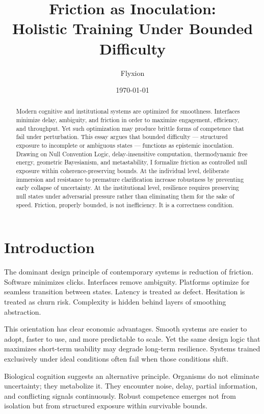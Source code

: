 \documentclass[12pt]{article}
\title{\textbf{Friction as Inoculation:\\
Holistic Training Under Bounded Difficulty}}
\author{Flyxion}
\date{\today}
\begin{document}
\maketitle

\begin{abstract}

Modern cognitive and institutional systems are optimized for smoothness. Interfaces minimize delay, ambiguity, and friction in order to maximize engagement, efficiency, and throughput. Yet such optimization may produce brittle forms of competence that fail under perturbation. This essay argues that bounded difficulty — structured exposure to incomplete or ambiguous states — functions as epistemic inoculation. Drawing on Null Convention Logic, delay-insensitive computation, thermodynamic free energy, geometric Bayesianism, and metastability, I formalize friction as controlled null exposure within coherence-preserving bounds. At the individual level, deliberate immersion and resistance to premature clarification increase robustness by preventing early collapse of uncertainty. At the institutional level, resilience requires preserving null states under adversarial pressure rather than eliminating them for the sake of speed. Friction, properly bounded, is not inefficiency. It is a correctness condition.

\end{abstract}

\newpage
\section{Introduction}

The dominant design principle of contemporary systems is reduction of friction. Software minimizes clicks. Interfaces remove ambiguity. Platforms optimize for seamless transition between states. Latency is treated as defect. Hesitation is treated as churn risk. Complexity is hidden behind layers of smoothing abstraction.

This orientation has clear economic advantages. Smooth systems are easier to adopt, faster to use, and more predictable to scale. Yet the same design logic that maximizes short-term usability may degrade long-term resilience. Systems trained exclusively under ideal conditions often fail when those conditions shift.

Biological cognition suggests an alternative principle. Organisms do not eliminate uncertainty; they metabolize it. They encounter noise, delay, partial information, and conflicting signals continuously. Robust competence emerges not from isolation but from structured exposure within survivable bounds.
\end{document}

